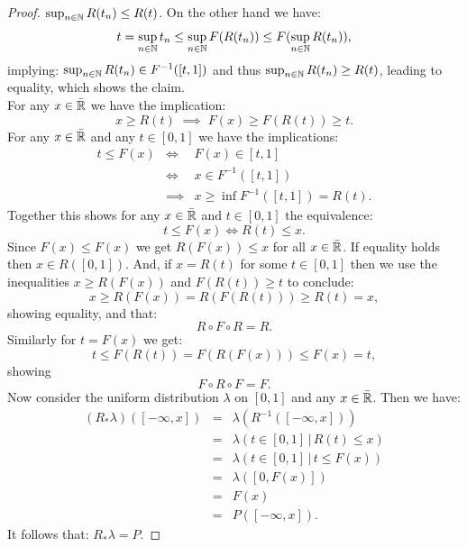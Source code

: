 \begin{Lem}
\begin{proof}
    $\sup_{n\in\mathbb{N}}R(t_n) \le R(t)$. On the other hand we have:
\[ t = \sup_{n \in\mathbb{N}} t_n \le \sup_{n\in\mathbb{N}} F(R(t_n)) \le F( \sup_{n\in\mathbb{N}} R(t_n)), \]
implying: $\sup_{n\in\mathbb{N}}R(t_n) \in F^{-1}([t,1])$ and thus $\sup_{n\in\mathbb{N}}R(t_n)\ge R(t)$, leading to equality, which shows the claim.\\
    For any  $x \in \bar{\mathbb{R}}$  we have the implication:
    \[x \ge R(t) \;\implies\; F(x) \ge F(R(t)) \ge t.\]
    For any $x \in \bar {\mathbb{R}}$ and any $t \in [0,1]$ we have the implications:
\[ \begin{array}{llll}
t \le F(x) &\iff& F(x) \in [t,1] \\
 &\iff& x \in F^{-1}([t,1]) \\
&\implies& x \ge \inf F^{-1}([t,1]) = R(t). %
\end{array}\]
Together this shows for any $x \in \bar {\mathbb{R}}$ and $t \in [0,1]$ the equivalence:
\[ t \le F(x) \iff R(t) \le x.  \] 
Since $F(x) \le F(x)$ we get $R(F(x)) \le x$ for all $x \in \bar{\mathbb{R}}$. %
If equality holds then $x \in R([0,1])$. And, if $x =R(t)$ for some $t \in [0,1]$ then we use the inequalities $x \ge R(F(x))$ and $F(R(t))\ge t$ to conclude:
\[ x \ge R(F(x)) = R ( F(R(t))) \ge R(t)=x,\]
showing equality, and that:
\[ R \circ F \circ R = R.\]
Similarly for $t=F(x)$ we get:
\[ t \le F(R(t)) = F ( R(F(x))) \le F(x)=t,\]
showing 
\[ F \circ R \circ F = F.\]
Now consider the uniform distribution $\lambda$ on $[0,1]$ and any $x \in \bar{\mathbb{R}}$.
Then we have:
\[ \begin{array}{llll}
    (R_*\lambda)([-\infty,x]) &=& \lambda(R^{-1}([-\infty,x])) \\
 &=&  \lambda(t \in [0,1] \,|\,  R(t) \le x) \\
 &=&  \lambda(t \in [0,1]\, |\, t \le F(x)) \\
&=&  \lambda([0, F(x)])\\
 &=& F(x)\\
&=& P([-\infty,x]).
\end{array}\]
It follows that: $R_*\lambda = P$.%
\end{proof}
\end{Lem}


